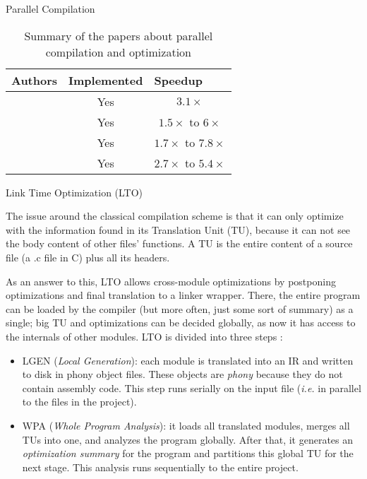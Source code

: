 \begin{section}{Parallel Compilation}
\begin{table}[]
\begin{tabular}{|l|c|c|}
\hline
Authors      & \multicolumn{1}{l|}{Implemented} & \multicolumn{1}{l|}{Speedup} \\ \hline
 \cite{vandevoorde1988parallel} & Yes                              & $3.1\times$                         \\ \hline
 \cite{wortman1992}     & Yes                              & $1.5\times$ to $6\times$                   \\ \hline
 \cite{Lee1994}         & Yes                               & $1.7\times$ to $7.8\times$                 \\ \hline
 \cite{kramer1994combining}     & Yes                               & $2.7\times$ to $5.4\times$                 \\ \hline
\end{tabular}
\caption{Summary of the papers about parallel compilation and optimization}
\label{table:parallel_comp_opt}
\end{table}

\begin{subsection}{Link Time Optimization (LTO)}\label{lto_section}

The issue around the classical compilation scheme is that it can only optimize with
the information found in its Translation Unit (TU), because it can not see the body
content of other files' functions. A TU is the
entire content of a source file (a .c file in C) plus all its headers.

As an answer to this, LTO allows cross-module optimizations by
postponing optimizations and final translation to a linker wrapper. There, the entire
program can be loaded by the compiler (but more often, just some sort of summary)
as a single; big TU and optimizations can be decided globally,
as now it has access to the internals of other modules. LTO is divided into
three steps \citep{whoprgoogle,glek2010optimizing}:
\begin{itemize}
\item LGEN (\textit{Local Generation}): each module is translated into an IR and
written to disk in phony object files. These objects are \emph{phony} because
they do not contain assembly code. This step runs serially on the input file
(\textit{i.e.} in parallel to the files in the project).

\item WPA (\textit{Whole Program Analysis}): it loads all translated modules,
merges all TUs into one, and analyzes the program globally. After that, it
generates an \emph{optimization summary} for the program and partitions this
global TU for the next stage. This analysis runs sequentially to the entire
project.


\end{itemize}
\end{subsection}
\end{section}
